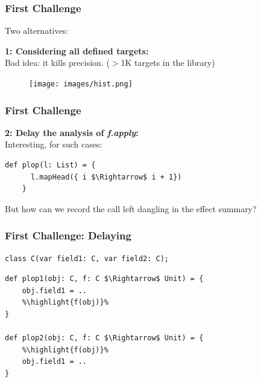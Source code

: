 \documentclass[hyperref={pdfpagelabels=false}]{beamer}
\newcommand\highlight[1]{\color{red}{#1}}
\begin{document}
\begin{frame}[fragile]
\frametitle{First Challenge}
    Two alternatives: 
    \vspace{15pt}

    \textbf{1: Considering all defined targets:}\\
    \vspace{5pt}
    Bad idea: it kills precision. ($>$1K targets in the library)

    \begin{figure}[t]
        \texttt{[image: images/hist.png]}\\
    \end{figure}

\end{frame}

\begin{frame}[fragile]
\frametitle{First Challenge}
    \textbf{2: Delay the analysis of \emph{f.apply}:}\\
    \vspace{5pt}
    Interesting, for such cases:

\begin{lstlisting}[escapechar=\%]
    def plop(l: List) = {
      l.mapHead({ i $\Rightarrow$ i + 1})
    }
\end{lstlisting}

 But how can we record the call left dangling in the effect summary?
\end{frame}

\begin{frame}[fragile]
\frametitle{First Challenge: Delaying}
\begin{lstlisting}[escapechar=\%]
class C(var field1: C, var field2: C);
\end{lstlisting}

\begin{lstlisting}[escapechar=\%]
def plop1(obj: C, f: C $\Rightarrow$ Unit) = {
    obj.field1 = ..
    %\highlight{f(obj)}%
}

def plop2(obj: C, f: C $\Rightarrow$ Unit) = {
    %\highlight{f(obj)}%
    obj.field1 = ..
}
\end{lstlisting}
    \begin{figure}
    \end{figure}
\end{frame}
\end{document}
